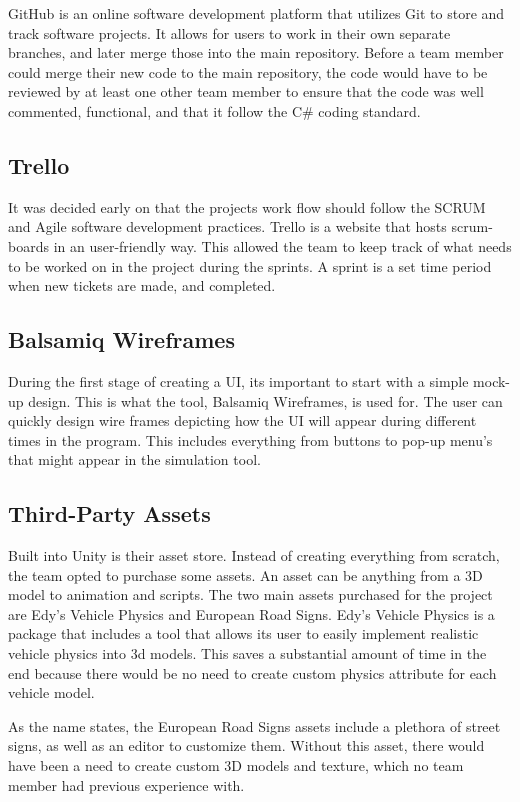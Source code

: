     GitHub is an online software development platform that utilizes Git to store and track software projects. It allows for users to work in their own separate branches, and later merge those into the main repository. Before a team member could merge their new code to the main repository, the code would have to be reviewed by at least one other team member to ensure that the code was well commented, functional, and that it follow the C\# coding standard.

\subsection{Trello}
    It was decided early on that the projects work flow should follow the SCRUM and Agile software development practices. Trello is a website that hosts scrum-boards in an user-friendly way. This allowed the team to keep track of what needs to be worked on in the project during the sprints. A sprint is a set time period when new tickets are made, and completed.

\subsection{Balsamiq Wireframes}
    During the first stage of creating a UI, its important to start with a simple mock-up design. This is what the tool, Balsamiq Wireframes, is used for. The user can quickly design wire frames depicting how the UI will appear during different times in the program. This includes everything from buttons to pop-up menu's that might appear in the simulation tool.

\subsection{Third-Party Assets}
    Built into Unity is their asset store. Instead of creating everything from scratch, the team opted to purchase some assets. An asset can be anything from a 3D model to animation and scripts. The two main assets purchased for the project are Edy's Vehicle Physics and European Road Signs. Edy's Vehicle Physics is a package that includes a tool that allows its user to easily implement realistic vehicle physics into 3d models. This saves a substantial amount of time in the end because there would be no need to create custom physics attribute for each vehicle model. 

    As the name states, the European Road Signs assets include a plethora of street signs, as well as an editor to customize them. Without this asset, there would have been a need to create custom 3D models and texture, which no team member had previous experience with.

